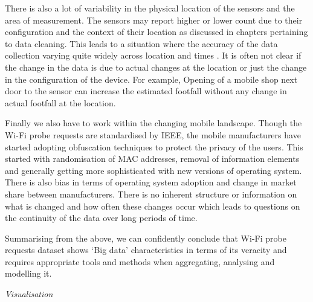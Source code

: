 There is also a lot of variability in the physical location of the sensors and the area of measurement.
The sensors may report higher or lower count due to their configuration and the context of their location as discussed in chapters pertaining to data cleaning.
This leads to a situation where the accuracy of the data collection varying quite widely across location and times \cite{lugomer2017understanding}.
It is often not clear if the change in the data is due to actual changes at the location or just the change in the configuration of the device.
For example, Opening of a mobile shop next door to the sensor can increase the estimated footfall without any change in actual footfall at the location.

Finally we also have to work within the changing mobile landscape.
Though the Wi-Fi probe requests are standardised by IEEE, the mobile manufacturers have started adopting obfuscation techniques to protect the privacy of the users.
This started with randomisation of MAC addresses, removal of information elements and generally getting more sophisticated with new versions of operating system.
There is also bias in terms of operating system adoption and change in market share between manufacturers.
There is no inherent structure or information on what is changed and how often these changes occur which leads to questions on the continuity of the data over long periods of time.

Summarising from the above, we can confidently conclude that Wi-Fi probe requests dataset shows `Big data' characteristics in terms of its veracity and requires appropriate tools and methods when aggregating, analysing and modelling it.


\vspace{1.5em}\noindent\textit{Visualisation}\vspace{0.5em}

